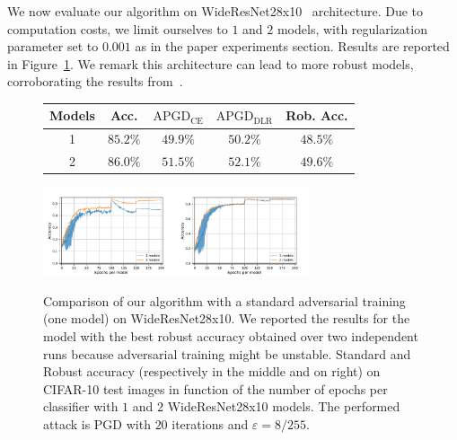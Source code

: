 We now evaluate our algorithm on WideResNet28x10~\cite{ZagoruykoK16} architecture. Due to computation costs, we limit ourselves to $1$ and $2$ models, with regularization parameter set to $0.001$ as in the paper experiments section. Results are reported in Figure~\ref{fig:xp-wideresnet}. We remark this architecture can lead to more robust models, corroborating the results from~\cite{gowal2020uncovering}.
\begin{figure}[!ht]
\begin{center}

\begin{small}
\begin{tabular}{c|c|ccc} 
\textbf{ Models} & \textbf{Acc. }&\textbf{$\textrm{APGD}_\textrm{CE}$}& \textbf{$\textrm{APGD}_\textrm{DLR}$} & \textbf{Rob. Acc.} \\ \hline
 1 & $85.2\%$ &	$49.9\%$ & $50.2\%$ & $48.5\%$ \\ 
 2 & $\bm{86.0\%}$ & $\bm{51.5\%}$ & $\bm{52.1\%}$ & $\bm{49.6\%}$\\ 

\end{tabular}
\end{small}

\includegraphics[width=0.35\textwidth]{Images/robust_acc_finalrun_WideResNet28x10_1024_200_0.001.pdf}\includegraphics[width=0.35\textwidth]{Images/standard_acc_finalrun_WideResNet28x10_1024_200_0.001.pdf} 
  
\caption{Comparison of our algorithm with a standard adversarial training (one model) on WideResNet28x10. We reported the results for the model with the best robust accuracy obtained over two independent runs because adversarial training might be unstable. Standard and Robust accuracy (respectively in the middle and on right) on CIFAR-10 test images in function of the number of epochs per classifier with $1$ and $2$ WideResNet28x10 models. The performed attack is PGD with $20$ iterations and $\varepsilon=8/255$.}
\label{fig:xp-wideresnet}
\end{center}
\end{figure}


